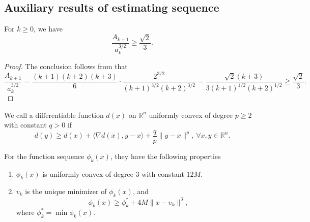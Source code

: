 \documentclass{article}
\begin{document}
\subsection{Auxiliary results of estimating sequence}
\begin{lemma}
    \label{lem.magnitude a and A}
    For $k\geq 0$, we have
    \begin{equation}
        \label{eq.magnitude a and A}
        \frac{A_{k+1}}{a_k^{3/2}} \geq \frac{\sqrt{2}}{3}.
    \end{equation}
\end{lemma}
\begin{proof}The conclusion follows from that
    $$\frac{A_{k+1}}{a_k^{3/2}}= \frac{(k+1)(k+2)(k+3)}{6}\cdot \frac{2^{3/2}}{(k+1)^{3/2}(k+2)^{3/2}} = \frac{\sqrt{2}(k+3)}{3(k+1)^{1/2}(k+2)^{1/2}} \geq \frac{\sqrt{2}}{3}.$$
\end{proof}
We call a differentiable function $d(x)$ on $\mathbb{R}^n$ uniformly convex \cite[Section 4.2.2]{nesterov2018lectures} of degree $p\geq 2$ with constant $q>0$ if
\begin{equation}
    \label{eq.uniformly convex of p}
    d(y)\geq d(x)+\langle \nabla d(x),y-x\rangle +\frac{q}{p}\|y-x\|^p, \ \forall x,y\in\mathbb{R}^n.
\end{equation}
\begin{lemma}
    \label{lem.property of phi}
    For the function sequence $\phi_k(x)$, they have the following properties
    \begin{enumerate}[label=(\roman*)]
        \item $\phi_k(x)$ is uniformly convex of degree $3$ with constant $12M$.
        \item $v_k$ is the unique minimizer of $\phi_k(x)$, and
              \begin{equation}
                  \label{eq.phi_k phi_low}
                  \phi_k(x)\geq \phi_k^* + 4M\|x-v_k\|^3,
              \end{equation}
              where $\phi_k^* =\min \phi_k(x).$
    \end{enumerate}
\end{lemma}
\end{document}
